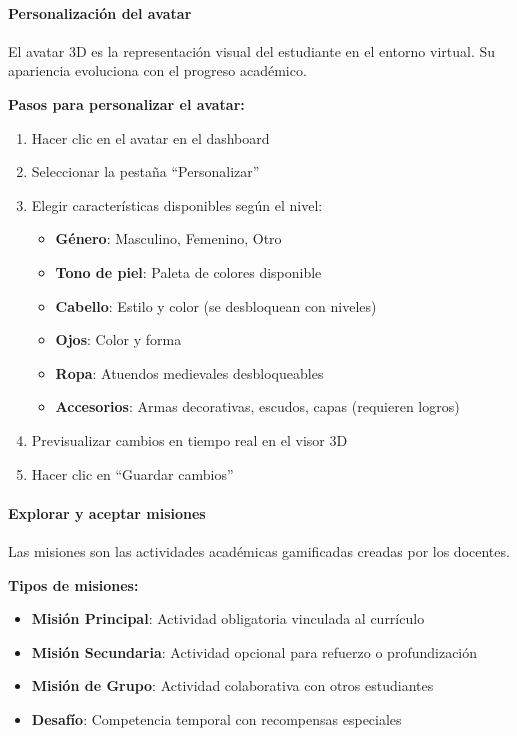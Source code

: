 \paragraph{Personalización del avatar}

El avatar 3D es la representación visual del estudiante en el entorno virtual. Su apariencia evoluciona con el progreso académico.

\textbf{Pasos para personalizar el avatar:}

\begin{enumerate}
	\item Hacer clic en el avatar en el dashboard
	\item Seleccionar la pestaña ``Personalizar''
	\item Elegir características disponibles según el nivel:
	\begin{itemize}
		\item \textbf{Género}: Masculino, Femenino, Otro
		\item \textbf{Tono de piel}: Paleta de colores disponible
		\item \textbf{Cabello}: Estilo y color (se desbloquean con niveles)
		\item \textbf{Ojos}: Color y forma
		\item \textbf{Ropa}: Atuendos medievales desbloqueables
		\item \textbf{Accesorios}: Armas decorativas, escudos, capas (requieren logros)
	\end{itemize}
	\item Previsualizar cambios en tiempo real en el visor 3D
	\item Hacer clic en ``Guardar cambios''
\end{enumerate}

\paragraph{Explorar y aceptar misiones}

Las misiones son las actividades académicas gamificadas creadas por los docentes.

\textbf{Tipos de misiones:}

\begin{itemize}
	\item \textbf{Misión Principal}: Actividad obligatoria vinculada al currículo
	\item \textbf{Misión Secundaria}: Actividad opcional para refuerzo o profundización
	\item \textbf{Misión de Grupo}: Actividad colaborativa con otros estudiantes
	\item \textbf{Desafío}: Competencia temporal con recompensas especiales
\end{itemize}

